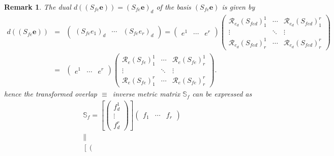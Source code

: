 \documentclass[aps,preprint]{revtex4}
\newtheorem{remark}[theorem]{Remark}
\begin{document}
\begin{remark}
The dual $d\left( \left( S_{fe}\boldsymbol{e}\right) \right) =\left( S_{fe}%
\boldsymbol{e}\right) _{d}$ of the basis $\left( S_{fe}\boldsymbol{e}\right) 
$ is given by 
\begin{eqnarray}
d\left( \left( S_{fe}\boldsymbol{e}\right) \right) &=&\left( 
\begin{array}{ccc}
\left( S_{fe}e_{1}\right) _{d} & \cdots & \left( S_{fe}e_{r}\right) _{d}%
\end{array}%
\right) =\left( 
\begin{array}{ccc}
e^{1} & \cdots & e^{r}%
\end{array}%
\right) \left( 
\begin{array}{ccc}
\mathcal{R}_{e_{d}}\left( S_{fed}\right) _{1}^{1} & \cdots & \mathcal{R}%
_{e_{d}}\left( S_{fed}\right) _{1}^{r} \\ 
\vdots & \ddots & \vdots \\ 
\mathcal{R}_{e_{d}}\left( S_{fed}\right) _{r}^{1} & \cdots & \mathcal{R}%
_{e_{d}}\left( S_{fed}\right) _{r}^{r}%
\end{array}%
\right) \\
&=&\left( 
\begin{array}{ccc}
e^{1} & \cdots & e^{r}%
\end{array}%
\right) \left( 
\begin{array}{ccc}
\mathcal{R}_{e}\left( S_{fe}\right) _{1}^{1} & \cdots & \mathcal{R}%
_{e}\left( S_{fe}\right) _{r}^{1} \\ 
\vdots & \ddots & \vdots \\ 
\mathcal{R}_{e}\left( S_{fe}\right) _{1}^{r} & \cdots & \mathcal{R}%
_{e}\left( S_{fe}\right) _{r}^{r}%
\end{array}%
\right) .
\end{eqnarray}%
hence the transformed \emph{overlap }$\equiv $\emph{\ inverse metric matrix} 
$\mathbb{S}_{f}$ can be expressed as 
\begin{gather}
\mathbb{S}_{f}=\left[ \left( 
\begin{array}{c}
f_{d}^{1} \\ 
\vdots \\ 
f_{d}^{r}%
\end{array}%
\right) \right] \left( 
\begin{array}{ccc}
f_{1} & \cdots & f_{r}%
\end{array}%
\right) \\
\parallel \\
\left[ \left( 
\begin{array}{ccc}

\end{array}
\end{gather}
\end{remark}
\end{document}
